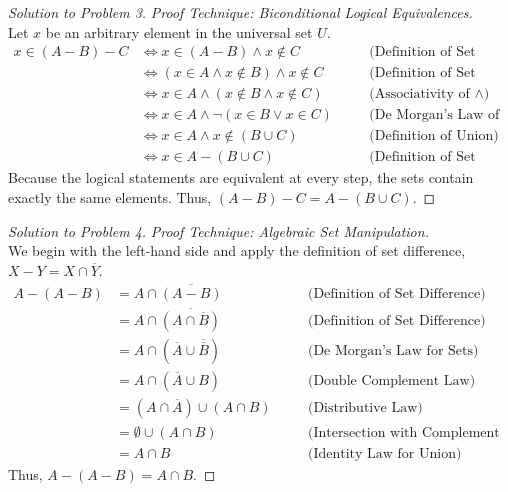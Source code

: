 \documentclass[12pt]{article}
\theoremstyle{definition}
\begin{document}
\begin{proof}[Solution to Problem 3]
\textit{Proof Technique: Biconditional Logical Equivalences.} \\
Let $x$ be an arbitrary element in the universal set $U$.
\begin{align*}
x \in (A - B) - C &\iff x \in (A - B) \land x \notin C \quad &&\text{(Definition of Set Difference)} \\
&\iff (x \in A \land x \notin B) \land x \notin C \quad &&\text{(Definition of Set Difference)} \\
&\iff x \in A \land (x \notin B \land x \notin C) \quad &&\text{(Associativity of } \land \text{)} \\
&\iff x \in A \land \neg(x \in B \lor x \in C) \quad &&\text{(De Morgan's Law of Logic)} \\
&\iff x \in A \land x \notin (B \cup C) \quad &&\text{(Definition of Union)} \\
&\iff x \in A - (B \cup C) \quad &&\text{(Definition of Set Difference)}
\end{align*}
Because the logical statements are equivalent at every step, the sets contain exactly the same elements. Thus, $(A - B) - C = A - (B \cup C)$.
\end{proof}

\begin{proof}[Solution to Problem 4]
\textit{Proof Technique: Algebraic Set Manipulation.} \\
We begin with the left-hand side and apply the definition of set difference, $X - Y = X \cap \overline{Y}$.
\begin{align*}
A - (A - B) &= A \cap \overline{(A - B)} \quad &&\text{(Definition of Set Difference)} \\
&= A \cap \overline{(A \cap \overline{B})} \quad &&\text{(Definition of Set Difference)} \\
&= A \cap (\overline{A} \cup \overline{\overline{B}}) \quad &&\text{(De Morgan's Law for Sets)} \\
&= A \cap (\overline{A} \cup B) \quad &&\text{(Double Complement Law)} \\
&= (A \cap \overline{A}) \cup (A \cap B) \quad &&\text{(Distributive Law)} \\
&= \emptyset \cup (A \cap B) \quad &&\text{(Intersection with Complement is Empty)} \\
&= A \cap B \quad &&\text{(Identity Law for Union)}
\end{align*}
Thus, $A - (A - B) = A \cap B$.
\end{proof}
\end{document}
